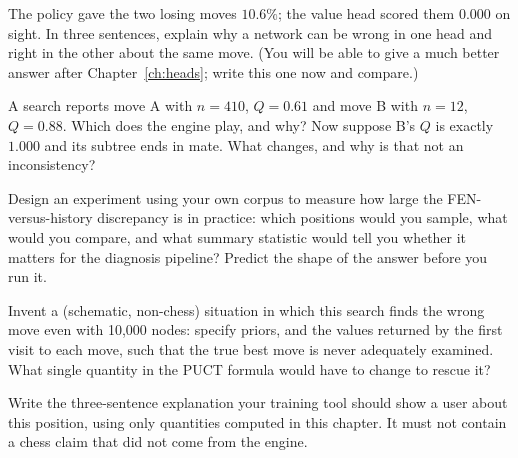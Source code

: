 \begin{exercises}
 The policy gave the two losing moves $10.6\%$;
the value head scored them $0.000$ on sight. In three sentences, explain why a network can be
wrong in one head and right in the other about the same move. (You will be able to give a
much better answer after Chapter~\ref{ch:heads}; write this one now and compare.)

 A search reports move A with $n = 410$,
$Q = 0.61$ and move B with $n = 12$, $Q = 0.88$. Which does the engine play, and why? Now
suppose B's $Q$ is exactly $1.000$ and its subtree ends in mate. What changes, and why is
that not an inconsistency?

 Design an experiment using your own corpus to
measure how large the FEN-versus-history discrepancy is in practice: which positions would
you sample, what would you compare, and what summary statistic would tell you whether it
matters for the diagnosis pipeline? Predict the shape of the answer before you run it.

 Invent a (schematic, non-chess) situation in
which this search finds the wrong move even with 10{,}000 nodes: specify priors, and the
values returned by the first visit to each move, such that the true best move is never
adequately examined. What single quantity in the PUCT formula would have to change to rescue
it?

 Write the three-sentence explanation your training tool
should show a user about this position, using only quantities computed in this chapter. It
must not contain a chess claim that did not come from the engine.

\end{exercises}
